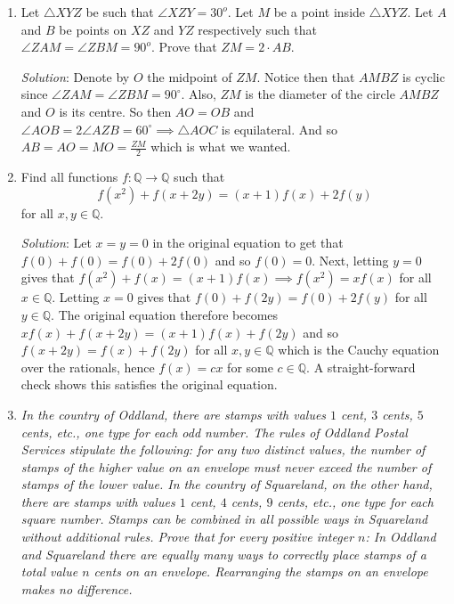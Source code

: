 \documentclass{article}
\begin{document}
\begin{enumerate}[1.]
\vfill

\item %
Let $\triangle XYZ$ be such that $\angle XZY = 30^o$. Let $M$ be a point inside $\triangle XYZ$. Let $A$ and $B$ be points on $XZ$ and $YZ$ respectively such that $\angle ZAM = \angle ZBM = 90^o$. Prove that $ZM = 2 \cdot AB$.

\textit{Solution}:
Denote by $O$ the midpoint of $ZM$. Notice then that $AMBZ$ is cyclic since $\angle ZAM = \angle ZBM = 90^\circ$. Also, $ZM$ is the diameter of the circle $AMBZ$ and $O$ is its centre. So then $AO=OB$ and $\angle AOB=2\angle AZB=60^\circ \implies \triangle AOC$ is equilateral. And so $AB=AO=MO=\frac{ZM}{2}$ which is what we wanted. 

\vfill

\item %
\newcommand{\QQ}{\mathbb{Q}}
Find all functions $f : \QQ \to \QQ$ such that
\[ f(x^2) +f(x+2y) = (x+1)f(x) +2f(y) \]
for all $x, y \in \QQ$. 

\textit{Solution}: 
Let $x=y=0$ in the original equation to get that $f(0)+f(0)=f(0)+2f(0)$ and so $f(0)=0$. Next, letting $y=0$ gives that $f(x^2)+f(x)=(x+1)f(x) \implies f(x^2)=xf(x)$ for all $x \in \QQ$. Letting $x=0$ gives that $f(0)+f(2y)=f(0)+2f(y)$ for all $y \in \QQ$. The original equation therefore becomes $xf(x)+f(x+2y)=(x+1)f(x)+f(2y)$ and so $f(x+2y)=f(x)+f(2y)$ for all $x,y \in \QQ$ which is the Cauchy equation over the rationals, hence $f(x)=cx$ for some $c\in\QQ$. A straight-forward check shows this satisfies the original equation.

\vfill

\item %
\textit{In the country of Oddland, there are stamps with values $1$ cent, $3$ cents, $5$ cents, etc., one type for each odd number.
The rules of Oddland Postal Services stipulate the following: for any two distinct values, the number of stamps of the higher value on an envelope must never exceed the number of stamps of the lower value.
In the country of Squareland, on the other hand, there are stamps with values $1$ cent, $4$ cents, $9$ cents, etc., one type for each square number.
Stamps can be combined in all possible ways in Squareland without additional rules.
Prove that for every positive integer $n$:
In Oddland and Squareland there are equally many ways to correctly place stamps of a total value $n$ cents on an envelope.
Rearranging the stamps on an envelope makes no difference.
}


\end{enumerate}
\end{document}

